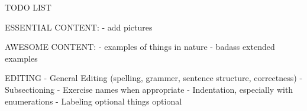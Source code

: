 TODO LIST

ESSENTIAL CONTENT:
  - add pictures

AWESOME CONTENT:
  - examples of things in nature
  - badass extended examples

EDITING
  - General Editing (spelling, grammer, sentence structure, correctness)
  - Subsectioning
  - Exercise names when appropriate
  - Indentation, especially with enumerations
  - Labeling optional things optional
